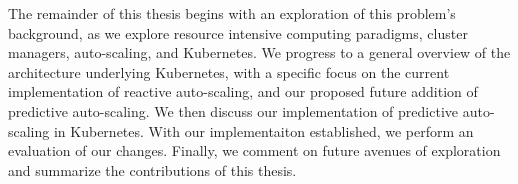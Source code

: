The remainder of this thesis begins with an exploration of this problem's
background, as we explore resource intensive computing paradigms, cluster
managers, auto-scaling, and Kubernetes. We progress to a general overview of the
architecture underlying Kubernetes, with a specific focus on the current
implementation of reactive auto-scaling, and our proposed future addition of
predictive auto-scaling. We then discuss our implementation of predictive
auto-scaling in Kubernetes. With our implementaiton established, we perform an
evaluation of our changes. Finally, we comment on future avenues of exploration
and summarize the contributions of this thesis.

